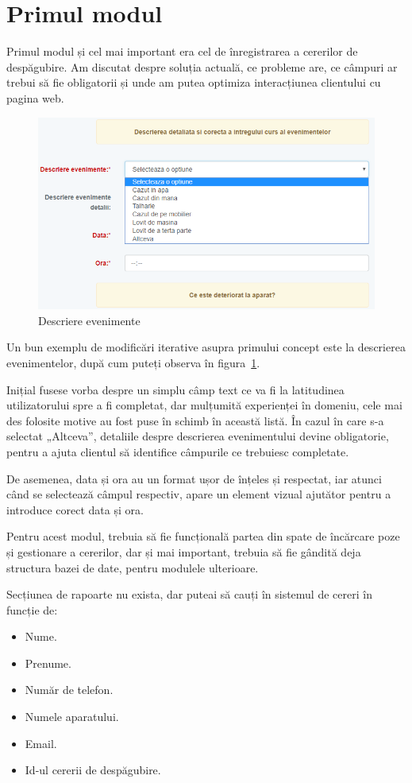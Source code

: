 \section{Primul modul}

	Primul modul și cel mai important era cel de înregistrarea a cererilor de despăgubire.
	Am discutat despre soluția actuală, ce probleme are, ce câmpuri ar trebui să fie obligatorii și unde am putea optimiza interacțiunea clientului cu pagina web.

	\begin{figure}
		\includegraphics[width=\linewidth]{../imagini/descriere_eveniment.png}
		\caption{Descriere evenimente}
		\label{fig:descriere_evenimente}
	\end{figure}

	Un bun exemplu de modificări iterative asupra primului concept este la descrierea evenimentelor, după cum puteți observa în figura~\ref{fig:descriere_evenimente}.

	Inițial fusese vorba despre un simplu câmp text ce va fi la latitudinea utilizatorului spre a fi completat, dar mulțumită experienței în domeniu, cele mai des folosite motive au fost puse în schimb în această listă.
	În cazul în care s-a selectat „Altceva”, detaliile despre descrierea evenimentului devine obligatorie, pentru a ajuta clientul să identifice câmpurile ce trebuiesc completate.

	De asemenea, data și ora au un format ușor de înțeles și respectat, iar atunci când se selectează câmpul respectiv, apare un element vizual ajutător pentru a introduce corect data și ora.

	Pentru acest modul, trebuia să fie funcțională partea din spate de încărcare poze și gestionare a cererilor, dar și mai important, trebuia să fie gândită deja structura bazei de date, pentru modulele ulterioare.


	Secțiunea de rapoarte nu exista, dar puteai să cauți în sistemul de cereri în funcție de:
	\begin{itemize}
		\item Nume.
		\item Prenume.
		\item Număr de telefon.
		\item Numele aparatului.
		\item Email.
		\item Id-ul cererii de despăgubire.
	\end{itemize}
